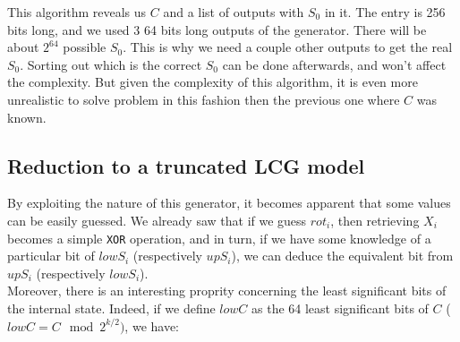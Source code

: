 \documentclass[preprint]{iacrtrans}
\begin{document}
This algorithm reveals us $C$ and a list of outputs with $S_0$ in it. The entry is 256 bits long, and we used 3 64 bits long outputs of the generator. There will be about $2^{64}$ possible $S_0$. This is why we need a couple other outputs to get the real $S_0$. Sorting out which is the correct $S_0$ can be done afterwards, and won't affect the complexity. But given the complexity of this algorithm, it is even more unrealistic to solve problem in this fashion then the previous one where $C$ was known.

\subsection{Reduction to a truncated LCG model}
By exploiting the nature of this generator, it becomes apparent that some values can be easily guessed. We already saw that if we guess $rot_i$, then retrieving $X_i$ becomes a simple \texttt{XOR} operation, and in turn, if we have some knowledge of a particular bit of $lowS_i$ (respectively $upS_i$), we can deduce the equivalent bit from $upS_i$ (respectively $lowS_i$).\\

Moreover, there is an interesting proprity concerning the least significant bits of the internal state. Indeed, if we define $lowC$ as the 64 least significant bits of $C$ ($lowC = C \mod{2^{k/2}})$, we have:
\end{document}
